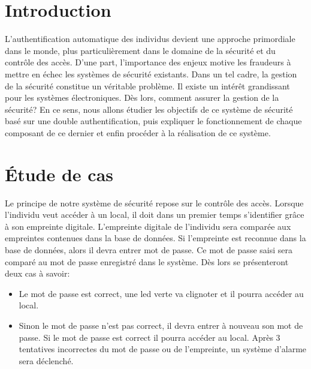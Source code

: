\documentclass[12pt, openany]{report}
\begin{document}
   \large
   \tableofcontents
   \large
   \listoffigures
    \large
     \listoftables

      \vfill
   \newpage
      \thispagestyle{empty}

   \vfill

   \chapter{Introduction}

L'authentification automatique des individus devient une approche primordiale dans le monde, plus particulièrement dans le domaine de la sécurité et du contrôle des accès. D'une part, l'importance des enjeux motive les fraudeurs à mettre en échec les systèmes de sécurité existants.
\newline
Dans un tel cadre, la gestion de la sécurité constitue un véritable problème.
Il existe un intérêt grandissant pour les systèmes électroniques. Dès lors, comment assurer la gestion de la sécurité?
\newline
En ce sens, nous allons étudier les objectifs de ce système de sécurité basé sur une double authentification, puis expliquer le fonctionnement de chaque composant de ce dernier et enfin procéder à la réalisation de ce système.

        \newpage
         \thispagestyle{empty}
     \chapter{Étude de cas}
     \large
Le principe de notre système de sécurité repose sur le contrôle des accès. Lorsque l'individu veut accéder à un local, il doit dans un premier temps s'identifier grâce à son empreinte digitale. L'empreinte digitale de l'individu sera comparée aux empreintes contenues dans la base de données. Si l'empreinte est reconnue dans la base de données, alors il devra entrer mot de passe. Ce mot de passe saisi sera comparé au mot de passe enregistré dans le système. Dès lors se présenteront deux cas à savoir:

         \begin{itemize}
\item Le mot de passe est correct, une led verte va clignoter et il pourra accéder au local.
\item Sinon le mot de passe n'est pas correct, il devra entrer à nouveau son mot de passe. Si le mot de passe est correct il pourra accéder au local. Après 3 tentatives incorrectes du mot de passe ou de l'empreinte, un système d'alarme sera déclenché.
         \end{itemize}
\end{document}
